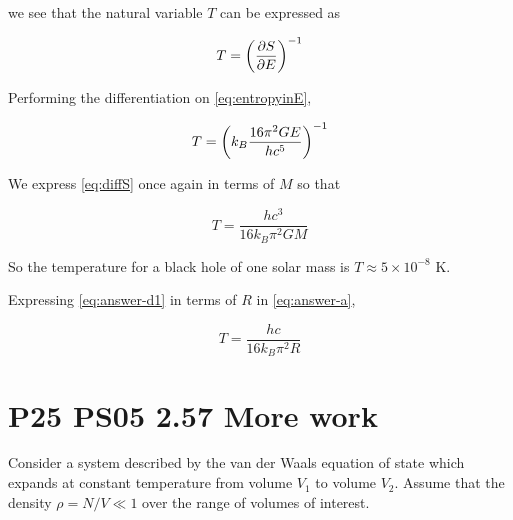 \documentclass[9pt,a4paper,twocolumn]{article}
\begin{document}
\begin{enumerate}[(a)]
we see that the natural variable $T$ can be expressed as

\begin{equation}\label{eq:naturaltemp}
	T = \qty(\pdv{S}{E})^{-1}
\end{equation}

Performing the differentiation on \eqref{eq:entropyinE},

\begin{equation}\label{eq:diffS}
	T = \qty(k_B \frac{16\pi^2 GE}{hc^5})^{-1}
\end{equation}

We express \eqref{eq:diffS} once again in terms of $M$ so that

\begin{equation}\label{eq:answer-d1}
	\boxed{
		T = \frac{hc^3}{16k_B \pi^2 GM}
	}
\end{equation}

So the temperature for a black hole of one solar mass is $\boxed{T \approx 5\times 10^{-8} \textrm{ K}}$.

Expressing \eqref{eq:answer-d1} in terms of $R$ in \eqref{eq:answer-a},

\begin{equation}\label{eq:answer-d2}
	\boxed{
		T = \frac{hc}{16k_B \pi^2 R}
	}
\end{equation}

\end{enumerate}

\section{P25 PS05 2.57 More work}
Consider a system described by the van der Waals equation of state which expands at constant temperature from volume $V_1$ to volume $V_2$. Assume that the density $\rho = N/V \ll 1$ over the range of volumes of interest.
\end{document}

